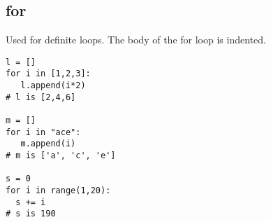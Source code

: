 \subsection{for}
Used for definite loops. The body of the for loop is indented.

\begin{lstlisting}
l = []
for i in [1,2,3]:
   l.append(i*2)
# l is [2,4,6]

m = []
for i in "ace":
   m.append(i)
# m is ['a', 'c', 'e']

s = 0
for i in range(1,20):
  s += i
# s is 190

\end{lstlisting}
